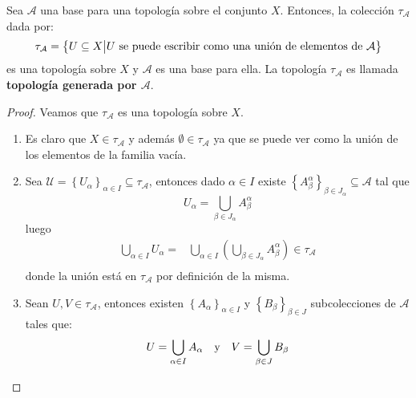\documentclass[12pt]{report}
\theoremstyle{largebreak}
\begin{document}
    \begin{propo}
        Sea $\mathcal{A}$ una base para una topología sobre el conjunto $X$. Entonces, la colección $\tau_{\mathcal{A}}$ dada por:
        \begin{equation*}
            \tau_{\mathcal{A}}=\left\{U\subseteq X\big| U\textup{ se puede escribir como una unión de elementos de }\mathcal{A} \right\}
        \end{equation*}
        es una topología sobre $X$ y $\mathcal{A}$ es una base para ella. La topología $\tau_{\mathcal{A}}$ es llamada \textbf{topología generada por $\mathcal{A}$}.
    \end{propo}

    \begin{proof}
        Veamos que $\tau_{\mathcal{A}}$ es una topología sobre $X$.
        \begin{enumerate}
            \item Es claro que $X\in\tau_{\mathcal{A}}$ y además $\emptyset\in\tau_{\mathcal{A}}$ ya que se puede ver como la unión de los elementos de la familia vacía.
            \item Sea $\mathcal{U}=\left\{U_\alpha\right\}_{\alpha\in I} \subseteq\mathcal{\tau_{\mathcal{A}}}$, entonces dado $\alpha\in I$ existe $\left\{A^\alpha_\beta\right\}_{\beta\in J_\alpha}\subseteq\mathcal{A}$ tal que
            \begin{equation*}
                U_\alpha=\bigcup_{\beta\in J_\alpha}A^\alpha_\beta
            \end{equation*}
            luego
            \begin{equation*}
                \begin{split}
                    \bigcup_{\alpha\in I}U_\alpha=&\bigcup_{\alpha\in I}\left(\bigcup_{\beta\in J_\alpha}A^\alpha_\beta \right)\in\tau_{\mathcal{A}} \\
                \end{split}
            \end{equation*}
            donde la unión está en $\tau_{\mathcal{A}}$ por definición de la misma.
            \item Sean $U,V\in\tau_{\mathcal{A}}$, entonces existen $\left\{A_\alpha \right\}_{\alpha\in I}$ y $\left\{B_\beta\right\}_{\beta\in J}$ subcolecciones de $\mathcal{A}$ tales que:
            \begin{equation*}
                U=\bigcup_{\alpha\in I}A_\alpha\quad \textup{y}\quad V=\bigcup_{\beta\in J}B_\beta
            \end{equation*}

\end{enumerate}
\end{proof}
\end{document}
